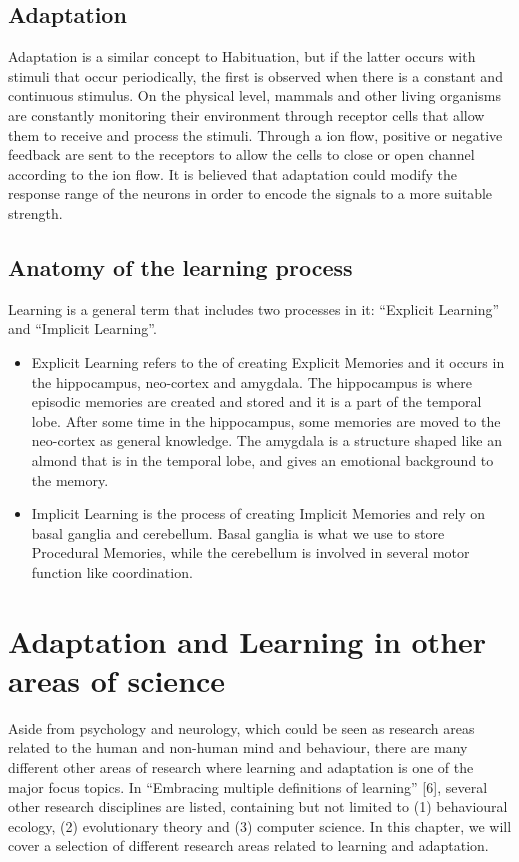 \documentclass[conference]{IEEEtran}
\begin{document}
	\subsection{Adaptation}\label{Ad}
		Adaptation is a similar concept to Habituation, but if the latter occurs with stimuli that occur periodically, the first is observed when there is a constant and continuous stimulus.
		On the physical level, mammals and other living organisms are constantly monitoring their environment through receptor cells that allow them to receive and process the stimuli. Through a ion flow, positive or negative feedback are sent to the receptors to allow the cells to close or open channel according to the ion flow. \cite{b8}
		It is believed that adaptation could modify the response range of the neurons in order to encode the signals to a more suitable strength. \cite{b9}

	\subsection{Anatomy of the learning process}\label{ALP}
		Learning is a general term that includes two processes in it: ``Explicit Learning'' and ``Implicit Learning''.
		\begin{itemize}
			\item Explicit Learning refers to the of creating Explicit Memories and it occurs in the hippocampus, neo-cortex and amygdala. \cite{b10} The hippocampus is where episodic memories are created and stored and it is a part of the temporal lobe. After some time in the hippocampus, some memories are moved to the neo-cortex as general knowledge. The amygdala is a structure shaped like an almond that is in the temporal lobe, and gives an emotional background to the memory.
			\item Implicit Learning is the process of creating Implicit Memories and rely on basal ganglia and cerebellum. \cite{b11} Basal ganglia is what we use to store Procedural Memories, while the cerebellum is involved in several motor function like coordination.
		\end{itemize}

\section{Adaptation and Learning in other areas of science}

	Aside from psychology and neurology, which could be seen as research areas related to the human and non-human mind and behaviour, there are many different other areas of research where learning and adaptation is one of the major focus topics. In ``Embracing multiple definitions of learning'' [6], several other research disciplines are listed, containing but not limited to (1) behavioural ecology, (2) evolutionary theory and (3) computer science. In this chapter, we will cover a selection of different research areas related to learning and adaptation.
\end{document}
